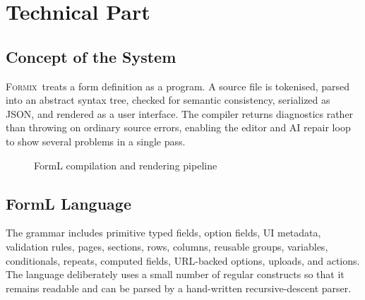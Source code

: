 \documentclass[12pt,a4paper,oneside]{report}
\newcommand{\formix}{\textsc{Formix}}
\begin{document}
\chapter{Technical Part}

\section{Concept of the System}
\formix\ treats a form definition as a program. A source file is tokenised, parsed into an
abstract syntax tree, checked for semantic consistency, serialized as JSON, and rendered as a
user interface. The compiler returns diagnostics rather than throwing on ordinary source
errors, enabling the editor and AI repair loop to show several problems in a single pass.

\begin{figure}[H]
\centering
{}
\caption{FormL compilation and rendering pipeline}
\label{fig:pipeline}
\end{figure}

\section{FormL Language}
The grammar includes primitive typed fields, option fields, UI metadata, validation rules,
pages, sections, rows, columns, reusable groups, variables, conditionals, repeats, computed
fields, URL-backed options, uploads, and actions. The language deliberately uses a small number
of regular constructs so that it remains readable and can be parsed by a hand-written
recursive-descent parser.
\end{document}

